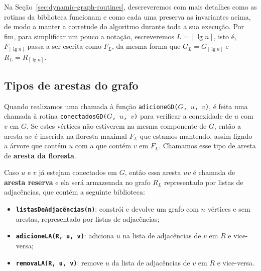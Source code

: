Na Seção~\ref{sec:dynamic-graph-routines}, descreveremos com mais detalhes como as rotinas da biblioteca funcionam e como cada uma preserva as invariantes acima, de modo a manter a corretude do algoritmo durante toda a sua execução. Por fim, para simplificar um pouco a notação, escreveremos $L = \left\lceil \lg n \right\rceil$, isto é, $F_{\left\lceil \lg n \right\rceil}$ passa a ser escrita como $F_{L}$, da mesma forma que $G_L = G_{\left\lceil \lg n \right\rceil}$ e $R_L = R_{\left\lceil \lg n \right\rceil}$.

\subsection{Tipos de arestas do grafo}
\label{sec:dynamic-graph-edge-types}


Quando realizamos uma chamada à função \texttt{adicioneGD($G$, $u$, $v$)}, é feita uma chamada à rotina \texttt{conectadosGD($G$, $u$, $v$)} para verificar a conexidade de $u$ com $v$ em $G$. Se estes vértices não estiverem na mesma componente de $G$, então a aresta $uv$ é inserida na floresta maximal $F_L$ que estamos mantendo, assim ligndo a árvore que contém $u$ com a que contém $v$ em $F_L$. Chamamos esse tipo de aresta de \textbf{aresta da floresta}.

Caso $u$ e $v$ já estejam conectados em $G$, então essa aresta $uv$ é chamada de \textbf{aresta reserva} e ela será armazenada no grafo $R_L$ representado por listas de adjacências, que contém a seguinte biblioteca:

\begin{itemize}
    \item \texttt{\textbf{listasDeAdjacências(n)}}: constrói e devolve um grafo com $n$ vértices e sem arestas, representado por listas de adjacências;
    \item \texttt{\textbf{adicioneLA(R, u, v)}}: adiciona $u$ na lista de adjacências de $v$ em $R$ e vice-versa;
    \item \texttt{\textbf{removaLA(R, u, v)}}: remove $u$ da lista de adjacências de $v$ em $R$ e vice-versa.
\end{itemize} 

